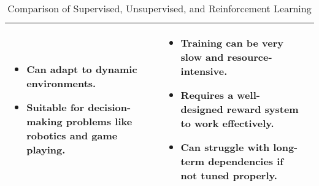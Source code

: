 \begin{table}[H]
\begin{tabular}{| m{3.5cm} | m{5cm} | m{5cm} |}
\begin{itemize}
                  \item Can adapt to dynamic environments.
                  \item Suitable for decision-making problems like robotics and game playing.
            \end{itemize} & 
            \begin{itemize}
                  \item Training can be very slow and resource-intensive.
                  \item Requires a well-designed reward system to work effectively.
                  \item Can struggle with long-term dependencies if not tuned properly.
            \end{itemize} \\ 
            \hline
      \end{tabular}
      \caption{Comparison of Supervised, Unsupervised, and Reinforcement Learning}
      \label{tab:ml_comparison}
\end{table}
